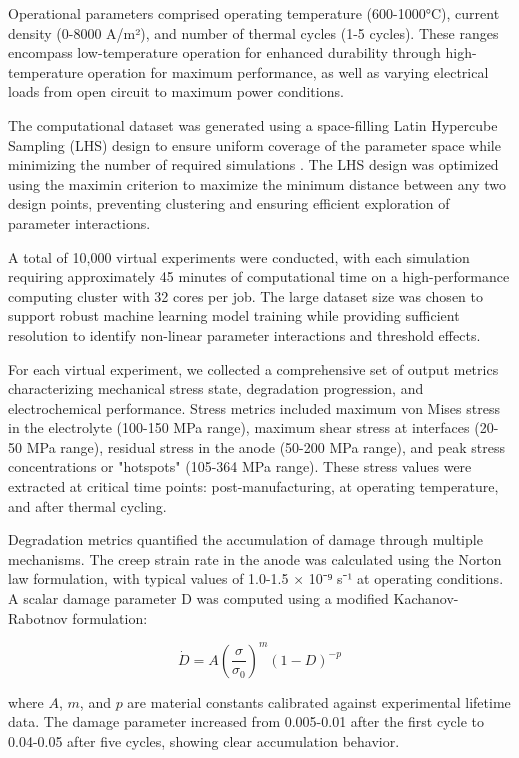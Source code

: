 \documentclass[conference]{IEEEtran}
\begin{document}
Operational parameters comprised operating temperature (600-1000°C), current density (0-8000 A/m²), and number of thermal cycles (1-5 cycles). These ranges encompass low-temperature operation for enhanced durability through high-temperature operation for maximum performance, as well as varying electrical loads from open circuit to maximum power conditions.

The computational dataset was generated using a space-filling Latin Hypercube Sampling (LHS) design to ensure uniform coverage of the parameter space while minimizing the number of required simulations \cite{helton2024sampling}. The LHS design was optimized using the maximin criterion to maximize the minimum distance between any two design points, preventing clustering and ensuring efficient exploration of parameter interactions.

A total of 10,000 virtual experiments were conducted, with each simulation requiring approximately 45 minutes of computational time on a high-performance computing cluster with 32 cores per job. The large dataset size was chosen to support robust machine learning model training while providing sufficient resolution to identify non-linear parameter interactions and threshold effects.

For each virtual experiment, we collected a comprehensive set of output metrics characterizing mechanical stress state, degradation progression, and electrochemical performance. Stress metrics included maximum von Mises stress in the electrolyte (100-150 MPa range), maximum shear stress at interfaces (20-50 MPa range), residual stress in the anode (50-200 MPa range), and peak stress concentrations or "hotspots" (105-364 MPa range). These stress values were extracted at critical time points: post-manufacturing, at operating temperature, and after thermal cycling.

Degradation metrics quantified the accumulation of damage through multiple mechanisms. The creep strain rate in the anode was calculated using the Norton law formulation, with typical values of 1.0-1.5 × 10⁻⁹ s⁻¹ at operating conditions. A scalar damage parameter D was computed using a modified Kachanov-Rabotnov formulation:

\begin{equation}
\dot{D} = A\left(\frac{\sigma}{\sigma_0}\right)^m (1-D)^{-p}
\end{equation}

where $A$, $m$, and $p$ are material constants calibrated against experimental lifetime data. The damage parameter increased from 0.005-0.01 after the first cycle to 0.04-0.05 after five cycles, showing clear accumulation behavior.
\end{document}
